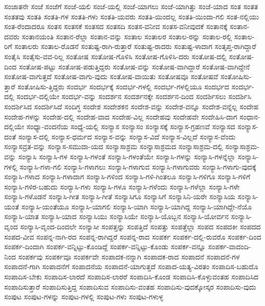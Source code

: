 {ಸಂಜಾತನೇ
ಸಂಜೆ
ಸಂಜೆಗೆ
ಸಂಜೆ-ಯಲಿ
ಸಂಜೆ-ಯಲ್ಲಿ
ಸಂಜೆ-ಯಾಗಲು
ಸಂಜೆ-ಯಾಗಿತ್ತು
ಸಂಜೆ-ಯಾದ
ಸಂತ
ಸಂತತ
ಸಂತತವು
ಸಂತತಿ
ಸಂತತಿ-ಗಳ
ಸಂತತಿ-ಗಳು
ಸಂತತಿ-ಯವರು
ಸಂತತಿ-ಯಿಂದಲ್ಲ
ಸಂತತಿ-ಯಿಂದಾ-ಗಲಿ
ಸಂತ-ನಲ್ಲಿಯು
ಸಂತ-ರೆಂದಾದರೂ
ಸಂತಸ
ಸಂತಸಕೆ
ಸಂತಸದ
ಸಂತಸದಿ
ಸಂತಸ-ವನೀವ
ಸಂತಸ-ವನೀವುದಕೆ
ಸಂತಾನಕ್ಕೆ
ಸಂತಾನ-ದವರು
ಸಂತಾನಯಂತಿ
ಸಂತಾನ-ರೆಲ್ಲಾ
ಸಂತಾನ-ವನ್ನು
ಸಂತಾಲ
ಸಂತಾಲರ
ಸಂತಾಲ-ರನ್ನು
ಸಂತಾಲ-ರಲ್ಲಿ
ಸಂತಾಲ-ರಿಗೆ
ಸಂತಾಲರು
ಸಂತಾಲ-ರೊಡನೆ
ಸಂತುಷ್ಟ-ರಾಗಿ-ರುತ್ತಾರೆ
ಸಂತುಷ್ಟ-ರಾದರು
ಸಂತುಷ್ಟ-ಳಾದಾಗ
ಸಂತೃಪ್ತ-ರಾಗಿದ್ದಾರೆ
ಸಂತೈಸಿ
ಸಂತೈಸು-ವವ-ರಿಲ್ಲ
ಸಂತೋಷ
ಸಂತೋಷ-ಗೊಳಿಸಿ
ಸಂತೋಷ-ಗೊಳಿಸಿ-ದರು
ಸಂತೋಷ-ದಲ್ಲಿ
ಸಂತೋಷ-ದಿಂದ
ಸಂತೋಷ-ಪಟ್ಟು
ಸಂತೋಷ-ಪಡುತ್ತಿದ್ದರು
ಸಂತೋಷ-ವನ್ನು
ಸಂತೋಷ-ವಾಗಿದ್ದಾರೆ
ಸಂತೋಷ-ವಾಗಿದ್ದೇನೆ
ಸಂತೋಷ-ವಾಗುತ್ತದೆ
ಸಂತೋಷ-ವಾಗು-ವುದು
ಸಂತೋಷ-ವಾಯಿತು
ಸಂತೋಷವೂ
ಸಂತೋಷವೆ
ಸಂತೋಷಿಸು-ತ್ತಾರೆ
ಸಂತೋಷಿಸು-ತ್ತಿದ್ದರು
ಸಂದರ್ಭ
ಸಂದರ್ಭಕ್ಕೆ
ಸಂದರ್ಭ-ಗಳಲ್ಲಿ
ಸಂದರ್ಭ-ಗಳಲ್ಲಿಯೂ
ಸಂದರ್ಭದ
ಸಂದರ್ಭ-ದಲ್ಲಿ
ಸಂದರ್ಭ-ದಲ್ಲಿಯೇ
ಸಂದರ್ಭ-ವನ್ನು
ಸಂದರ್ಶನ
ಸಂದರ್ಶನಕ್ಕೇ
ಸಂದರ್ಶನ-ದಿಂದ
ಸಂದರ್ಶಿಸಲು
ಸಂದರ್ಶಿಸಿ
ಸಂದರ್ಶಿಸಿದ
ಸಂದರ್ಶಿಸಿದೆ
ಸಂದಿಗ್ಧ
ಸಂದೇಶ
ಸಂದೇಶಕನ
ಸಂದೇಶ-ವನ್ನು
ಸಂದೇಶ-ವನ್ನೂ
ಸಂದೇಶ-ವನ್ನೆಲ್ಲ
ಸಂದೇಹ
ಸಂದೇಹ-ಗಳನ್ನು
ಸಂದೇಹ-ದಲ್ಲಿ
ಸಂದೇಹ-ವಾದ
ಸಂದೇಹ-ವಿಲ್ಲ
ಸಂದೇಹವು
ಸಂದೇಹವೇ
ಸಂದೇಹಿಸಿ-ದಾಗ
ಸಂಧಾನ-ದಲ್ಲಿಯೇ
ಸಂಧ್ಯಾ-ವಂದನೆಯ
ಸಂಧ್ಯೆ-ಯಲ್ಲಿ
ಸಂನ್ಯಾಸ
ಸಂನ್ಯಾಸಂ
ಸಂನ್ಯಾಸಕ್ಕೆ
ಸಂನ್ಯಾಸ-ಗ್ರಹಣವೆ
ಸಂನ್ಯಾಸದ
ಸಂನ್ಯಾಸ-ದಂತೆ
ಸಂನ್ಯಾಸ-ದಲ್ಲಿ
ಸಂನ್ಯಾಸ-ಧರ್ಮದ
ಸಂನ್ಯಾಸ-ವನ್ನು
ಸಂನ್ಯಾಸ-ವಿದೆ
ಸಂನ್ಯಾಸ-ವಿಲ್ಲದೆ
ಸಂನ್ಯಾಸ-ವೆಂದು
ಸಂನ್ಯಾಸವ್ರತ-ವನ್ನು
ಸಂನ್ಯಾಸ-ಸಮುದಾ-ಯದ
ಸಂನ್ಯಾಸಾಶ್ರಮ
ಸಂನ್ಯಾಸಾಶ್ರಮದ
ಸಂನ್ಯಾಸಾಶ್ರಮ-ದಲ್ಲಿ
ಸಂನ್ಯಾಸಾಶ್ರಮ-ವನ್ನು
ಸಂನ್ಯಾಸಿ
ಸಂನ್ಯಾಸಿ-ಗಳ
ಸಂನ್ಯಾಸಿ-ಗಳಂತೆ
ಸಂನ್ಯಾಸಿ-ಗಳಂತೆಯೇ
ಸಂನ್ಯಾಸಿ-ಗಳನ್ನು
ಸಂನ್ಯಾಸಿ-ಗಳನ್ನೆಲ್ಲಾ
ಸಂನ್ಯಾಸಿ-ಗಳಲ್ಲಿ
ಸಂನ್ಯಾಸಿ-ಗಳಾ-ಗಲಿ
ಸಂನ್ಯಾಸಿ-ಗಳಾಗಲು
ಸಂನ್ಯಾಸಿ-ಗಳಾಗುವ
ಸಂನ್ಯಾಸಿ-ಗಳಾಗುವರು
ಸಂನ್ಯಾಸಿ-ಗಳಾಗು-ವುದಕ್ಕೆ
ಸಂನ್ಯಾಸಿ-ಗಳಾದ
ಸಂನ್ಯಾಸಿ-ಗಳಾದಾಗ
ಸಂನ್ಯಾಸಿ-ಗಳಿಂದ
ಸಂನ್ಯಾಸಿ-ಗಳಿ-ಗಿಂತಲೂ
ಸಂನ್ಯಾಸಿ-ಗಳಿಗೂ
ಸಂನ್ಯಾಸಿ-ಗಳಿಗೆ
ಸಂನ್ಯಾಸಿ-ಗಳಿರ-ಬಹುದು
ಸಂನ್ಯಾಸಿ-ಗಳು
ಸಂನ್ಯಾಸಿ-ಗಳೂ
ಸಂನ್ಯಾಸಿ-ಗಳೆಂದು
ಸಂನ್ಯಾಸಿ-ಗಳೆಲ್ಲಾ
ಸಂನ್ಯಾಸಿ-ಗಳೇ
ಸಂನ್ಯಾಸಿ-ಗಳೊಡನೆ
ಸಂನ್ಯಾಸಿ-ಗೀತ
ಸಂನ್ಯಾಸಿ-ಗೀತೆ
ಸಂನ್ಯಾಸಿಗೂ
ಸಂನ್ಯಾಸಿಗೆ
ಸಂನ್ಯಾಸಿನಿ-ಯರೇ
ಸಂನ್ಯಾಸಿಯ
ಸಂನ್ಯಾಸಿ-ಯಂತೆ
ಸಂನ್ಯಾಸಿ-ಯಂತೆಯೂ
ಸಂನ್ಯಾಸಿ-ಯಾಗಲಿ
ಸಂನ್ಯಾಸಿ-ಯಾಗಿ
ಸಂನ್ಯಾಸಿ-ಯಾಗಿದ್ದ
ಸಂನ್ಯಾಸಿ-ಯಾಗಿದ್ದೇ-ನೆಯೊ
ಸಂನ್ಯಾಸಿ-ಯಾತ
ಸಂನ್ಯಾಸಿ-ಯಾದ
ಸಂನ್ಯಾಸಿಯು
ಸಂನ್ಯಾಸಿಯೇ
ಸಂನ್ಯಾಸಿ-ಯೊಬ್ಬನ
ಸಂನ್ಯಾಸಿ-ಯೋರ್ವನ
ಸಂನ್ಯಾಸಿ-ವೃಂದ
ಸಂನ್ಯಾಸಿ-ವೃಂದ-ದಿಂದಲೇ
ಸಂನ್ಯಾಸೀ
ಸಂಪತ್ತನ್ನು
ಸಂಪತ್ತಿದೆ
ಸಂಪತ್ತು
ಸಂಪತ್ತೆಲ್ಲಾ
ಸಂಪದ
ಸಂಪದಕೀ
ಸಂಪದದ
ಸಂಪದ-ವೀವ
ಸಂಪನ್ನ-ನಾಗಿ-ರದ
ಸಂಪನ್ನ-ರಾಗಿದ್ದರೆ
ಸಂಪನ್ನ-ರಾದ
ಸಂಪರ್ಕ
ಸಂಪರ್ಕ-ದಲ್ಲಿ-ರುವರೊ
ಸಂಪರ್ಕ-ದಿಂದ
ಸಂಪರ್ಕ-ದಿಂದಾಗಿ
ಸಂಪರ್ಕ-ವನ್ನಿಟ್ಟು-ಕೊಂಡಿದ್ದೆ
ಸಂಪರ್ಕ-ವನ್ನಿಟ್ಟು-ಕೊಂಡು
ಸಂಪರ್ಕ-ವನ್ನೂ
ಸಂಪರ್ಕ-ವಾದಂದಿ-ನಿಂದ
ಸಂಪರ್ಕವು
ಸಂಪರ್ಕವೂ
ಸಂಪರ್ಕವೇ
ಸಂಪಾದಕ-ನನ್ನಾಗಿ
ಸಂಪಾದಕ-ರಾದ
ಸಂಪಾದನೆ
ಸಂಪಾದನೆ-ಗಳ
ಸಂಪಾದನೆ-ಗಾಗಿ
ಸಂಪಾದನೆಗೆ
ಸಂಪಾದನೆಯ
ಸಂಪಾದನೆ-ಯಾಗುತ್ತದೆ
ಸಂಪಾದ-ಯತ್ಯ-ವಿರತಂ
ಸಂಪಾದಿಸ-ಬಹುದೊ
ಸಂಪಾದಿಸ-ಬೇಕು
ಸಂಪಾದಿಸ-ಲಾರದೆ
ಸಂಪಾದಿಸ-ಲಾರರೆ
ಸಂಪಾದಿಸಿ-ಕೊಂಡ
ಸಂಪಾದಿಸಿ-ಕೊಳ್ಳುವಂತಹ
ಸಂಪಾದಿಸಿದ
ಸಂಪಾದಿಸುತ್ತಾರೆ
ಸಂಪಾದಿಸುತ್ತಿದ್ದ
ಸಂಪಾದಿಸುವ
ಸಂಪಾದಿಸು-ವಂತಹ
ಸಂಪಾದಿಸು-ವುದಕ್ಕೋಸ್ಕರ
ಸಂಪಾದಿಸು-ವುದು
ಸಂಪುಟ
ಸಂಪುಟ-ಗಳನ್ನು
ಸಂಪುಟ-ಗಳಲ್ಲಿ
ಸಂಪುಟ-ಗಳು
ಸಂಪುಟ-ಗಳುಳ್ಳ
}
